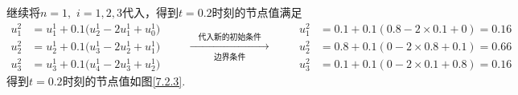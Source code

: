 继续将$n=1,\,\,i=1,2,3$代入，得到$t=0.2$时刻的节点值满足
\begin{equation*}
	\begin{aligned}
		u_1^2 &= u_1^1 + 0.1\big(u_2^1 - 2u_1^1 + u_0^1\big)\\
		u_2^2 &= u_2^1 + 0.1\big(u_3^1 - 2u_2^1 +u_1^1\big)\\
		u_3^2 &= u_3^1 + 0.1\big(u_4^1 - 2u_3^1 + u_2^1\big)
	\end{aligned}
	\quad \quad \xrightarrow[\mbox{边界条件}]{\quad \mbox{代入新的初始条件} \quad} \quad \quad 
	\begin{aligned}
		u_1^2 &= 0.1+0.1(0.8-2\times 0.1 +0)=0.16\\
		u_2^2 &= 0.8+0.1(0-2\times 0.8+0.1)=0.66\\
		u_3^2 &= 0.1 + 0.1(0-2\times 0.1+0.8)=0.16
	\end{aligned}
\end{equation*}
得到$t=0.2$时刻的节点值如图\ref{7.2.3}.
\vspace*{0.5em}

